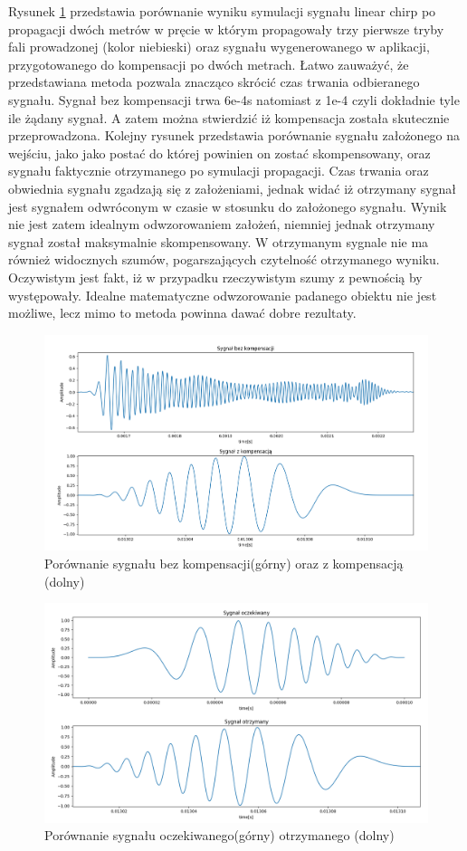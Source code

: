 Rysunek \ref{fig:porownanie} przedstawia porównanie wyniku symulacji sygnału linear chirp po propagacji dwóch metrów w pręcie w którym propagowały trzy pierwsze tryby fali prowadzonej (kolor niebieski) oraz sygnału wygenerowanego w aplikacji, przygotowanego do kompensacji po dwóch metrach. Łatwo zauważyć, że przedstawiana metoda pozwala znacząco skrócić czas trwania odbieranego sygnału. Sygnał bez kompensacji trwa 6e-4s natomiast z 1e-4 czyli dokładnie tyle ile żądany sygnał. A zatem można stwierdzić iż kompensacja została skutecznie przeprowadzona. Kolejny rysunek przedstawia porównanie sygnału założonego na wejściu, jako jako postać do której powinien on zostać skompensowany, oraz sygnału faktycznie otrzymanego po symulacji propagacji. Czas trwania oraz obwiednia sygnału zgadzają się z założeniami, jednak widać iż otrzymany sygnał jest sygnałem odwróconym w czasie w stosunku do założonego sygnału. Wynik nie jest zatem idealnym odwzorowaniem założeń, niemniej jednak otrzymany sygnał został maksymalnie skompensowany. W otrzymanym sygnale nie ma również widocznych szumów, pogarszających czytelność otrzymanego wyniku. Oczywistym jest fakt, iż w przypadku rzeczywistym szumy z pewnością by występowały. Idealne matematyczne odwzorowanie padanego obiektu nie jest możliwe, lecz mimo to metoda powinna dawać dobre rezultaty.

\begin{figure}[h]
\centering
\includegraphics[width=14cm]{Zdjecia/4/tr_porownanie}
\caption{Porównanie sygnału bez kompensacji(górny) oraz z kompensacją (dolny)}
\label{fig:porownanie}
\end{figure} 

\begin{figure}[h]
\centering
\includegraphics[width=14cm]{Zdjecia/4/tr_porownanie2}
\caption{Porównanie sygnału oczekiwanego(górny) otrzymanego (dolny)}
\label{fig:porownanie2}
\end{figure} 
